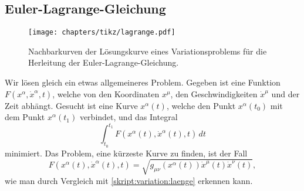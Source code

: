 \subsection{Euler-Lagrange-Gleichung%
\label{skript:geodaeten:subsection:Euler-Lagrange-Gleichung}}
\begin{figure}
\texttt{[image: chapters/tikz/lagrange.pdf]}
\caption{Nachbarkurven der Lösungskurve eines Variationsproblems
für die Herleitung der Euler-Lagrange-Gleichung.
\label{skript:geodaeten:fig:lagrange}}
\end{figure}
Wir lösen gleich ein etwas allgemeineres Problem.
Gegeben ist eine Funktion $F(x^\alpha, \dot x^\alpha, t)$, welche
von den Koordinaten $x^\mu$, den Geschwindigkeiten $\dot x^\mu$ und
der Zeit abhängt.
Gesucht ist eine Kurve $x^\alpha(t)$, welche 
den Punkt $x^\alpha(t_0)$ mit dem Punkt $x^\alpha(t_1)$ verbindet,
und das Integral
\begin{equation}
\int_{t_0}^{t_1} F(x^\alpha(t), \dot x^\alpha(t), t)\,dt
\label{skript:variation:funktional}
\end{equation}
minimiert.
Das Problem, eine kürzeste Kurve zu finden, ist der Fall
\[
F(x^\alpha(t),\dot x^\alpha(t),t)
=
\sqrt{g_{\mu\nu}(x^\alpha(t)) \dot x^\mu(t)\dot x^\nu(t)},
\]
wie man durch Vergleich mit \eqref{skript:variation:laenge}
erkennen kann.

